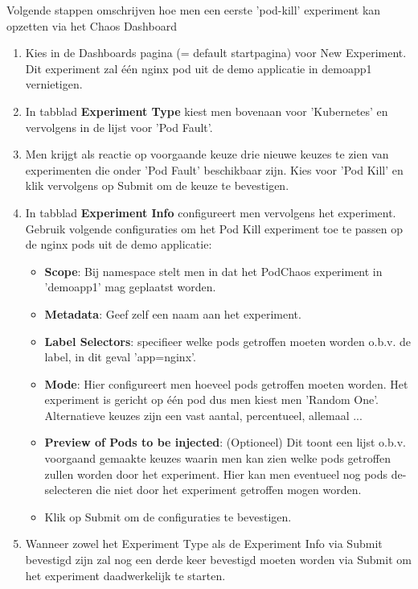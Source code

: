 Volgende stappen omschrijven hoe men een eerste 'pod-kill' experiment kan opzetten via het Chaos Dashboard \autocite{ChaosMesh2022b}
\begin{enumerate}
    \item Kies in de Dashboards pagina (= default startpagina) voor New Experiment. Dit experiment zal één nginx pod uit de demo applicatie in demoapp1 vernietigen.
    \item In tabblad {\bf Experiment Type} kiest men bovenaan voor 'Kubernetes' en vervolgens in de lijst voor 'Pod Fault'. 
    \item Men krijgt als reactie op voorgaande keuze drie nieuwe keuzes te zien van experimenten die onder 'Pod Fault' beschikbaar zijn. Kies voor 'Pod Kill' en klik vervolgens op Submit om de keuze te bevestigen.
    \item In tabblad {\bf Experiment Info} configureert men vervolgens het experiment. Gebruik volgende configuraties om het Pod Kill experiment toe te passen op de nginx pods uit de demo applicatie:
        \begin{itemize}
            \item {\bf Scope}: Bij namespace stelt men in dat het PodChaos experiment in 'demoapp1' mag geplaatst worden.
            \item {\bf Metadata}: Geef zelf een naam aan het experiment.
            \item {\bf Label Selectors}: specifieer welke pods getroffen moeten worden o.b.v. de label, in dit geval 'app=nginx'.
            \item {\bf Mode}: Hier configureert men hoeveel pods getroffen moeten worden. Het experiment is gericht op één pod dus men kiest men 'Random One'. Alternatieve keuzes zijn een vast aantal, percentueel, allemaal ...
            \item {\bf Preview of Pods to be injected}: (Optioneel) Dit toont een lijst o.b.v. voorgaand gemaakte keuzes waarin men kan zien welke pods getroffen zullen worden door het experiment. Hier kan men eventueel nog pods de-selecteren die niet door het experiment getroffen mogen worden.
            \item Klik op Submit om de configuraties te bevestigen.
        \end{itemize}
    \item Wanneer zowel het Experiment Type als de Experiment Info via Submit bevestigd zijn zal nog een derde keer bevestigd moeten worden via Submit om het experiment daadwerkelijk te starten.
\end{enumerate}

